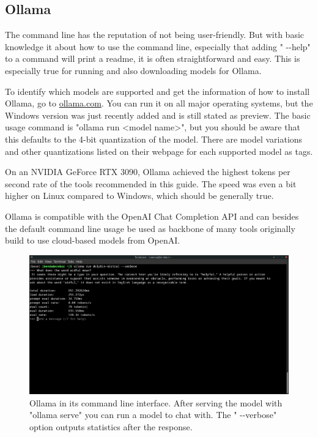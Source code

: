 \documentclass[parskip=half]{scrreprt} %
\begin{document}
\subsection{Ollama}
The command line has the reputation of not being user-friendly.
But with basic knowledge it about how to use the command line, especially that adding " -{}-help" to a command will print a readme, it is often straightforward and easy.
This is especially true for running and also downloading models for Ollama.

To identify which models are supported and get the information of how to install Ollama, go to \href{https://ollama.ai}{ollama.com}.
You can run it on all major operating systems, but the Windows version was just recently added and is still stated as preview.
The basic usage command is "ollama run <model name>", but you should be aware that this defaults to the 4-bit quantization of the model.
There are model variations and other quantizations listed on their webpage for each supported model as tags.

On an NVIDIA GeForce RTX 3090, Ollama achieved the highest tokens per second rate of the tools recommended in this guide. The speed was even a bit higher on Linux compared to Windows, which should be generally true.

Ollama is compatible with the OpenAI Chat Completion API and can besides the default command line usage be used as backbone of many tools originally build to use cloud-based models from OpenAI.

\begin{figure}[h]
	\includegraphics[width=\textwidth]{ollama}
	\caption{Ollama in its command line interface. After serving the model with "ollama serve" you can run a model to chat with. The " -{}-verbose" option outputs statistics after the response.}
	\label{fig:ollama}
\end{figure}
\end{document}
